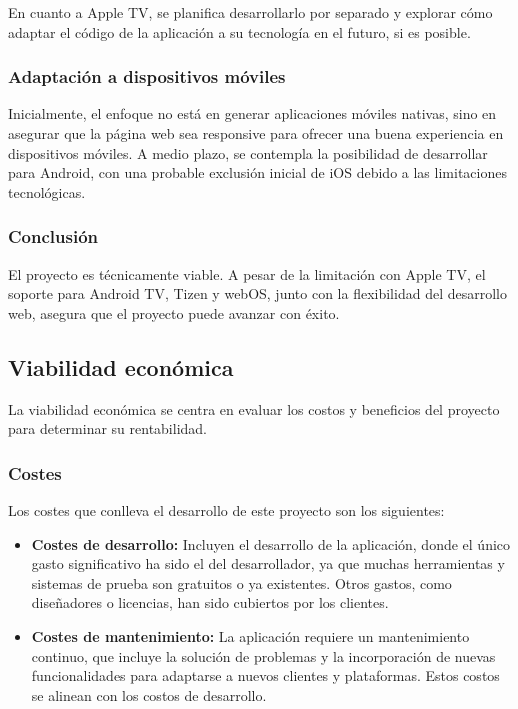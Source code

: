 En cuanto a Apple TV, se planifica desarrollarlo por separado y explorar cómo adaptar el código de la aplicación 
a su tecnología en el futuro, si es posible.

\subsubsection{Adaptación a dispositivos móviles}
\label{subsubsec:analisis_estudio_viabilidad_tecnica_aplicacion_movil}

Inicialmente, el enfoque no está en generar aplicaciones móviles nativas, sino en asegurar que la página web 
sea responsive para ofrecer una buena experiencia en dispositivos móviles. A medio plazo, se contempla la 
posibilidad de desarrollar para Android, con una probable exclusión inicial de iOS debido a las limitaciones tecnológicas.

\subsubsection{Conclusión}
\label{subsubsec:analisis_estudio_viabilidad_tecnica_conclusion}

El proyecto es técnicamente viable. A pesar de la limitación con Apple TV, el soporte para Android TV, Tizen 
y webOS, junto con la flexibilidad del desarrollo web, asegura que el proyecto puede avanzar con éxito.

\subsection{Viabilidad económica}
\label{subsec:analisis_estudio_viabilidad_economica}

La viabilidad económica se centra en evaluar los costos y beneficios del proyecto para determinar su rentabilidad.

\subsubsection{Costes}
\label{subsubsec:analisis_estudio_viabilidad_economica_costes}
Los costes que conlleva el desarrollo de este proyecto son los siguientes:

\begin{itemize}
    \item \textbf{Costes de desarrollo:} Incluyen el desarrollo de la aplicación, donde el único gasto significativo ha sido 
    el del desarrollador, ya que muchas herramientas y sistemas de prueba son gratuitos o ya existentes. Otros gastos, 
    como diseñadores o licencias, han sido cubiertos por los clientes.
    
    \item \textbf{Costes de mantenimiento:} La aplicación requiere un mantenimiento continuo, que incluye la solución de 
    problemas y la incorporación de nuevas funcionalidades para adaptarse a nuevos clientes y plataformas. Estos costos 
    se alinean con los costos de desarrollo.
\end{itemize}

